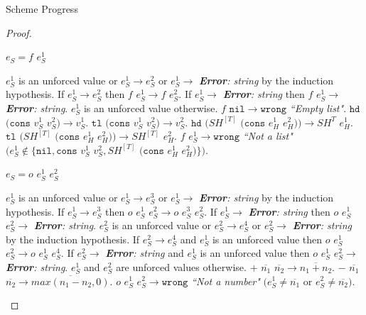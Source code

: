 \begin{theorem}{Scheme Progress}
\begin{proof}
\begin{case}
\end{case}


\begin{case}

$e_{S}=f$ $e_{S}^{1}$

$e_{S}^{1}$ is an unforced value or $e_{S}^{1}\rightarrow e_{S}^{2}$ or $e_{S}^{1}\rightarrow$ \emph{\textbf{Error}: string} by the induction hypothesis.  If $e_{S}^{1}\rightarrow e_{S}^{2}$ then $f$ $e_{S}^{1}\rightarrow f$ $e_{S}^{2}$.  If $e_{S}^{1}\rightarrow$ \emph{\textbf{Error}: string} then $f$ $e_{S}^{1}\rightarrow$ \emph{\textbf{Error}: string}.  $e_{S}^{1}$ is an unforced value otherwise.  $f$ $\mathtt{nil}\rightarrow\mathtt{wrong}$ \emph{``Empty list"}.  $\mathtt{hd}$ $(\mathtt{cons}$ $v_{S}^{1}$ $v_{S}^{2})\rightarrow v_{S}^{1}$.  $\mathtt{tl}$ $(\mathtt{cons}$ $v_{S}^{1}$ $v_{S}^{2})\rightarrow v_{S}^{2}$.  $\mathtt{hd}$ $(SH^{[T]}$ $(\mathtt{cons}$ $e_{H}^{1}$ $e_{H}^{2}))\rightarrow SH^{T}$ $e_{H}^{1}$.  $\mathtt{tl}$ $(SH^{[T]}$ $(\mathtt{cons}$ $e_{H}^{1}$ $e_{H}^{2}))\rightarrow SH^{[T]}$ $e_{H}^{2}$.  $f$ $e_{S}^{1}\rightarrow\mathtt{wrong}$ \emph{``Not a list"} $(e_{S}^{1}\not\in\lbrace\mathtt{nil},\mathtt{cons}$ $v_{S}^{1}$ $v_{S}^{2},SH^{[T]}$ $(\mathtt{cons}$ $e_{H}^{1}$ $e_{H}^{2})\rbrace)$.

\end{case}


\begin{case}

$e_{S}=o$ $e_{S}^{1}$ $e_{S}^{2}$

$e_{S}^{1}$ is an unforced value or $e_{S}^{1}\rightarrow e_{S}^{3}$ or $e_{S}^{1}\rightarrow$ \emph{\textbf{Error}: string} by the induction hypothesis.  If $e_{S}^{1}\rightarrow e_{S}^{3}$ then $o$ $e_{S}^{1}$ $e_{S}^{2}\rightarrow o$ $e_{S}^{3}$ $e_{S}^{2}$.  If $e_{S}^{1}\rightarrow$ \emph{\textbf{Error}: string} then $o$ $e_{S}^{1}$ $e_{S}^{2}\rightarrow$ \emph{\textbf{Error}: string}.  $e_{S}^{2}$ is an unforced value or $e_{S}^{2}\rightarrow e_{S}^{4}$ or $e_{S}^{2}\rightarrow$ \emph{\textbf{Error}: string} by the induction hypothesis.  If $e_{S}^{2}\rightarrow e_{S}^{4}$ and $e_{S}^{1}$ is an unforced value then $o$ $e_{S}^{1}$ $e_{S}^{2}\rightarrow o$ $e_{S}^{1}$ $e_{S}^{4}$.  If $e_{S}^{2}\rightarrow$ \emph{\textbf{Error}: string} and $e_{S}^{1}$ is an unforced value then $o$ $e_{S}^{1}$ $e_{S}^{2}\rightarrow$ \emph{\textbf{Error}: string}.  $e_{S}^{1}$ and $e_{S}^{2}$ are unforced values otherwise.  $+$ $\overline{n_{1}}$ $\overline{n_{2}}\rightarrow\overline{n_{1}+n_{2}}$.  $-$ $\overline{n_{1}}$ $\overline{n_{2}}\rightarrow\overline{max(n_{1}-n_{2},0)}$.  $o$ $e_{S}^{1}$ $e_{S}^{2}\rightarrow\mathtt{wrong}$ \emph{``Not a number"} $(e_{S}^{1}\neq\overline{n_{1}}$ or $e_{S}^{2}\neq\overline{n_{2}})$.


\end{case}
\end{proof}
\end{theorem}
